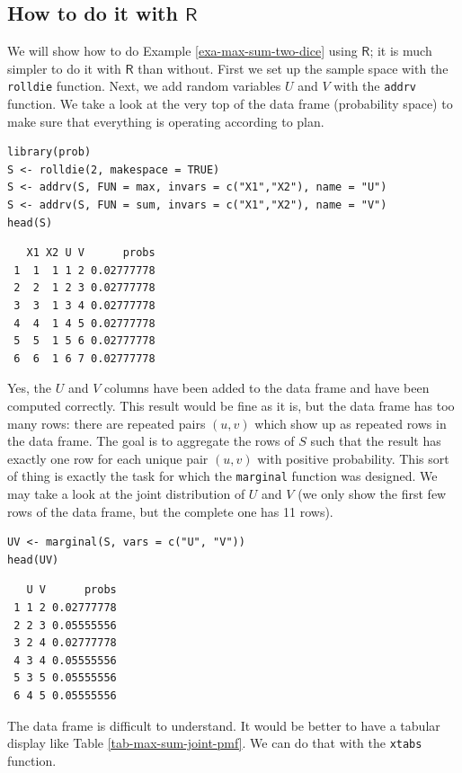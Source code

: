 \documentclass[captions=tableheading]{scrbook}
\begin{document}
\subsection{How to do it with \(\mathsf{R}\)}
\label{sec-7-1-1}


We will show how to do Example \ref{exa-max-sum-two-dice} using \(\mathsf{R}\); it is much simpler to do it with \(\mathsf{R}\) than without. First we set up the sample space with the \texttt{rolldie} function. Next, we add random variables \(U\) and \(V\) with the \texttt{addrv} function. We take a look at the very top of the data frame (probability space) to make sure that everything is operating according to plan.




\begin{verbatim}
library(prob)  
S <- rolldie(2, makespace = TRUE)
S <- addrv(S, FUN = max, invars = c("X1","X2"), name = "U")
S <- addrv(S, FUN = sum, invars = c("X1","X2"), name = "V")
head(S)
\end{verbatim}

\begin{verbatim}
   X1 X2 U V      probs
 1  1  1 1 2 0.02777778
 2  2  1 2 3 0.02777778
 3  3  1 3 4 0.02777778
 4  4  1 4 5 0.02777778
 5  5  1 5 6 0.02777778
 6  6  1 6 7 0.02777778
\end{verbatim}

Yes, the \(U\) and \(V\) columns have been added to the data frame and have been computed correctly. This result would be fine as it is, but the data frame has too many rows: there are repeated pairs \((u,v)\) which show up as repeated rows in the data frame. The goal is to aggregate the rows of \(S\) such that the result has exactly one row for each unique pair \((u,v)\) with positive probability. This sort of thing is exactly the task for which the \texttt{marginal} function was designed. We may take a look at the joint distribution of \(U\) and \(V\) (we only show the first few rows of the data frame, but the complete one has 11 rows).


\begin{verbatim}
UV <- marginal(S, vars = c("U", "V"))
head(UV)
\end{verbatim}

\begin{verbatim}
   U V      probs
 1 1 2 0.02777778
 2 2 3 0.05555556
 3 2 4 0.02777778
 4 3 4 0.05555556
 5 3 5 0.05555556
 6 4 5 0.05555556
\end{verbatim}

The data frame is difficult to understand. It would be better to have a tabular display like Table \ref{tab-max-sum-joint-pmf}. We can do that with the \texttt{xtabs} function. 
\end{document}
